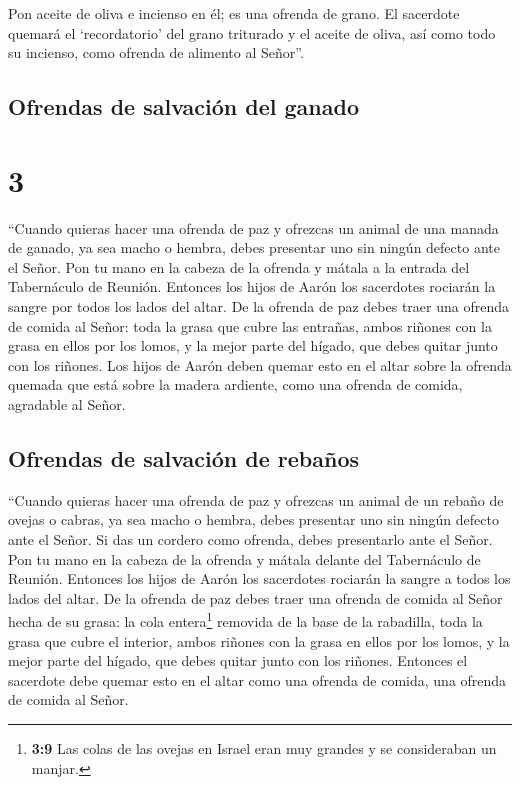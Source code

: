  Pon aceite de oliva e incienso en él; es una ofrenda de
grano.  El sacerdote quemará el `recordatorio' del grano
triturado y el aceite de oliva, así como todo su incienso, como ofrenda
de alimento al Señor''.

\hypertarget{ofrendas-de-salvaciuxf3n-del-ganado}{%
\subsection{Ofrendas de salvación del
ganado}\label{ofrendas-de-salvaciuxf3n-del-ganado}}

\hypertarget{section-2}{%
\section{3}\label{section-2}}

 ``Cuando quieras hacer una ofrenda de paz y ofrezcas un
animal de una manada de ganado, ya sea macho o hembra, debes presentar
uno sin ningún defecto ante el Señor.  Pon tu mano en la
cabeza de la ofrenda y mátala a la entrada del Tabernáculo de Reunión.
Entonces los hijos de Aarón los sacerdotes rociarán la sangre por todos
los lados del altar.  De la ofrenda de paz debes traer una
ofrenda de comida al Señor: toda la grasa que cubre las entrañas,
 ambos riñones con la grasa en ellos por los lomos, y la
mejor parte del hígado, que debes quitar junto con los riñones.
 Los hijos de Aarón deben quemar esto en el altar sobre la
ofrenda quemada que está sobre la madera ardiente, como una ofrenda de
comida, agradable al Señor.

\hypertarget{ofrendas-de-salvaciuxf3n-de-rebauxf1os}{%
\subsection{Ofrendas de salvación de
rebaños}\label{ofrendas-de-salvaciuxf3n-de-rebauxf1os}}

 ``Cuando quieras hacer una ofrenda de paz y ofrezcas un
animal de un rebaño de ovejas o cabras, ya sea macho o hembra, debes
presentar uno sin ningún defecto ante el Señor.  Si das un
cordero como ofrenda, debes presentarlo ante el Señor. 
Pon tu mano en la cabeza de la ofrenda y mátala delante del Tabernáculo
de Reunión. Entonces los hijos de Aarón los sacerdotes rociarán la
sangre a todos los lados del altar.  De la ofrenda de paz
debes traer una ofrenda de comida al Señor hecha de su grasa: la cola
entera\footnote{\textbf{3:9} Las colas de las ovejas en Israel eran muy
  grandes y se consideraban un manjar.} removida de la base de la
rabadilla, toda la grasa que cubre el interior,  ambos
riñones con la grasa en ellos por los lomos, y la mejor parte del
hígado, que debes quitar junto con los riñones.  Entonces
el sacerdote debe quemar esto en el altar como una ofrenda de comida,
una ofrenda de comida al Señor.

